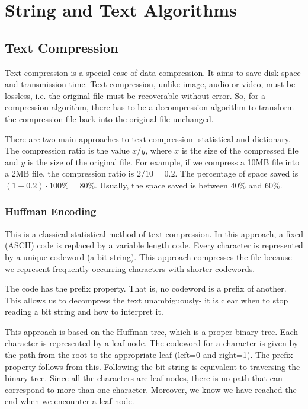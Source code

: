 \documentclass[a4paper, openany]{memoir}
\begin{document}
\chapter{String and Text Algorithms}
\section{Text Compression}
Text compression is a special case of data compression. It aims to save disk space and transmission time. Text compression, unlike image, audio or video, must be lossless, i.e. the original file must be recoverable without error. So, for a compression algorithm, there has to be a decompression algorithm to transform the compression file back into the original file unchanged.

There are two main approaches to text compression- statistical and dictionary. The compression ratio is the value $x/y$, where $x$ is the size of the compressed file and $y$ is the size of the original file. For example, if we compress a 10MB file into a 2MB file, the compression ratio is $2/10 = 0.2$. The percentage of space saved is $(1 - 0.2) \cdot 100\% = 80\%$. Usually, the space saved is between $40\%$ and $60\%$.

\subsection{Huffman Encoding}
This is a classical statistical method of text compression. In this approach, a fixed (ASCII) code is replaced by a variable length code. Every character is represented by a unique codeword (a bit string). This approach compresses the file because we represent frequently occurring characters with shorter codewords.

The code has the prefix property. That is, no codeword is a prefix of another. This allows us to decompress the text unambiguously- it is clear when to stop reading a bit string and how to interpret it.

This approach is based on the Huffman tree, which is a proper binary tree. Each character is represented by a leaf node. The codeword for a character is given by the path from the root to the appropriate leaf (left=0 and right=1). The prefix property follows from this. Following the bit string is equivalent to traversing the binary tree. Since all the characters are leaf nodes, there is no path that can correspond to more than one character. Moreover, we know we have reached the end when we encounter a leaf node.
\end{document}
